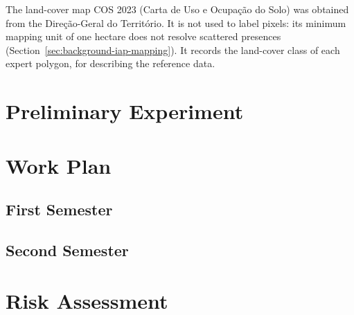 The land-cover map COS 2023 (Carta de Uso e Ocupação do Solo) was
obtained from the Direção-Geral do Território. It is not used to
label pixels: its minimum mapping unit of one hectare does not resolve
scattered presences (Section~\ref{sec:background-iap-mapping}). It
records the land-cover class of each expert polygon, for describing the
reference data.

\section{Preliminary Experiment}
\label{sec:proposed-work-preliminary}

\section{Work Plan}
\label{sec:proposed-work-plan}

\subsection{First Semester}
\label{sec:proposed-work-plan-first}

\subsection{Second Semester}
\label{sec:proposed-work-plan-second}

\section{Risk Assessment}
\label{sec:proposed-work-risks}

